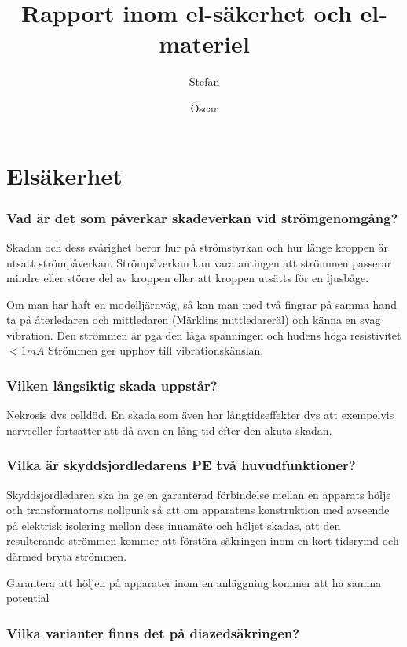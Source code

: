 \documentclass[a4paper,swedish]{article}
\title{Rapport inom el-säkerhet och el-materiel}
\author{Stefan}
\author{Oscar}
\begin{document}
\part{Elsäkerhet}
\setcounter{section}{1}
\section{Vad är det som påverkar skadeverkan vid strömgenomgång?} \label{sec:strömgenomgång}

Skadan och dess svårighet beror hur på strömstyrkan och hur länge kroppen är utsatt strömpåverkan.
Strömpåverkan kan vara antingen att strömmen passerar mindre eller större del av kroppen eller att kroppen
utsätts för en ljusbåge.

Om man har haft en modelljärnväg, så kan man med två fingrar på samma hand ta på återledaren och mittledaren (Märklins mittledareräl) och känna en svag
vibration. Den strömmen är pga den låga spänningen och hudens höga resistivitet $< 1 mA$
Strömmen ger upphov till vibrationskänslan.

\setcounter{section}{3}
\section{Vilken långsiktig skada uppstår?}\label{sec:permanent_skada}

Nekrosis dvs celldöd. En skada som även har långtidseffekter dvs att exempelvis nervceller
fortsätter att då även en lång tid efter den akuta skadan.

\setcounter{section}{5}
\section{Vilka är skyddsjordledarens PE två huvudfunktioner?}\label{sec:skyddsjordsledarens_funktioner}

Skyddsjordledaren ska ha ge en garanterad förbindelse mellan en apparats hölje och transformatorns nollpunk
så att om apparatens konstruktion
med avseende på elektrisk isolering mellan dess innamäte och höljet skadas, att den resulterande strömmen
kommer att förstöra säkringen inom en kort tidsrymd och därmed bryta strömmen.

Garantera att höljen på apparater inom en anläggning kommer att ha samma potential

\setcounter{section}{7}
\section{Vilka varianter finns det på diazedsäkringen?}\label{sec:diazedvarianter}
\end{document}
